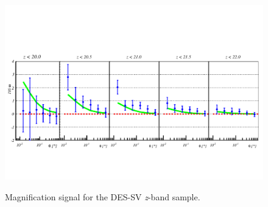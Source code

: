 \begin{figure}
\includegraphics[width=\textwidth,trim={0 2.3cm 0 3.5cm},clip]{./figures/mag_z.pdf}
\label{fig:resultsSV_z}
\caption{Magnification signal for the DES-SV {\it z}-band sample.	}
\end{figure}
\newline

